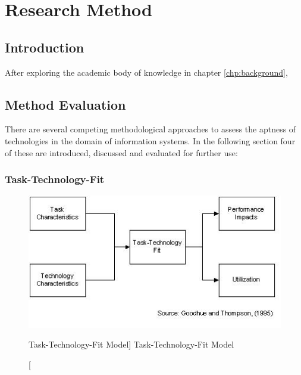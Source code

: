 \chapter{Research Method}


\section{Introduction}

After exploring the academic body of knowledge in chapter \ref{chp:background}, 


\section{Method Evaluation}

There are several competing methodological approaches to assess the aptness of technologies in the domain of information systems. In the following section four of these are introduced, discussed and evaluated for further use:

    
    \subsection{Task-Technology-Fit}
    \begin{figure}[ht]
        \includegraphics[width=0.7\linewidth]{images/methodology/ttf.jpg}\centering
        \caption
        [Task-Technology-Fit Model]
        {Task-Technology-Fit Model \cite{Goodhue1995Task-TechnologyPerformance}}
    \end{figure}
    

